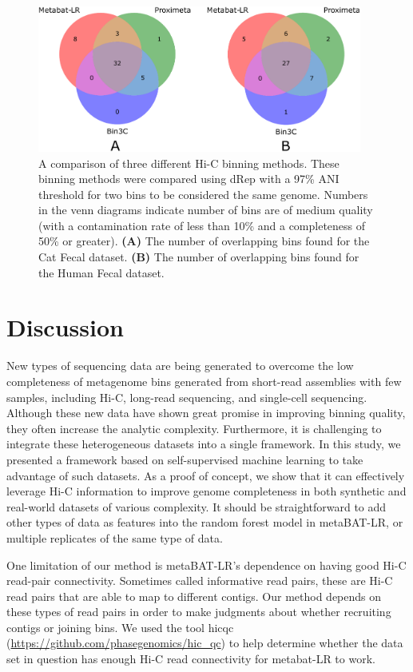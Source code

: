\documentclass[fleqn,10pt,lineno]{wlpeerj}
\begin{document}
\begin{figure}[ht!]
    \centering
    \includegraphics[width=0.95\textwidth,height=0.95\textheight,keepaspectratio]{Comparision_filtered_venn2.pdf}
    \caption{A comparison of three different Hi-C binning methods. These binning methods were compared using dRep with a 97\% ANI threshold for two bins to be considered the same genome. Numbers in the venn diagrams indicate number of bins are of medium quality (with a contamination rate of less than 10\% and a completeness of 50\% or greater). \textbf{(A)} The number of overlapping bins found for the Cat Fecal dataset. \textbf{(B)} The number of overlapping bins found for the Human Fecal dataset.}
    \label{fig:Comparison_Fig}
\end{figure}

\section*{Discussion}

New types of sequencing data are being generated to overcome the low completeness of metagenome bins generated from short-read assemblies with few samples, including Hi-C, long-read sequencing, and single-cell sequencing. Although these new data have shown great promise in improving binning quality, they often increase the analytic complexity. Furthermore, it is challenging to integrate these heterogeneous datasets into a single framework. In this study, we presented a framework based on self-supervised machine learning to take advantage of such datasets. As a proof of concept, we show that it can effectively leverage Hi-C information to improve genome completeness in both synthetic and real-world datasets of various complexity. It should be straightforward to add other types of data as features into the random forest model in metaBAT-LR, or multiple replicates of the same type of data.

One limitation of our method is metaBAT-LR's dependence on having good Hi-C read-pair connectivity. Sometimes called informative read pairs, these are Hi-C read pairs that are able to map to different contigs. Our method depends on these types of read pairs in order to make judgments about whether recruiting contigs or joining bins. We used the tool hic\textunderscore qc (\url{https://github.com/phasegenomics/hic_qc}) to help determine whether the data set in question has enough Hi-C read connectivity for metabat-LR to work.
\end{document}
